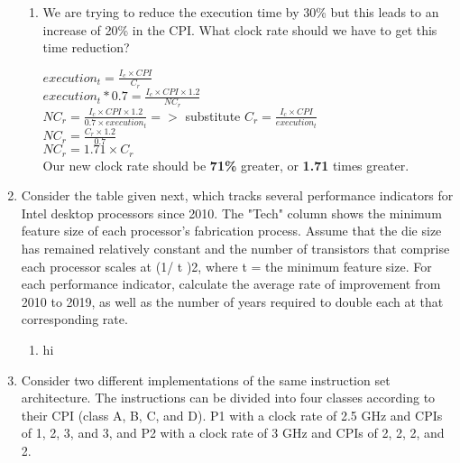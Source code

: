 \documentclass[10pt]{article}
\begin{document}
\begin{enumerate}
\begin{enumerate}
        \item We are trying to reduce the execution time by 30\% but this leads to an increase of 20\% in the CPI. What clock rate should we have to get this time reduction?
        \begin{center}
            $execution_t = \frac{I_c \times CPI}{C_r}$\\
            $execution_t * 0.7 = \frac{I_c \times CPI \times 1.2}{NC_r}$\\
            $NC_r = \frac{I_c \times CPI \times 1.2}{0.7 \times execution_t} =>$ substitute $C_r = \frac{I_c \times CPI}{execution_t}$\\
            $NC_r = \frac{C_r \times 1.2}{0.7}$\\
            $NC_r = 1.71 \times C_r$\\
            Our new clock rate should be \textbf{71\%} greater, or \textbf{1.71} times greater.
        \end{center}
    \end{enumerate}
    \item Consider the table given next, which tracks several performance indicators for Intel desktop processors since 2010.
    The "Tech" column shows the minimum feature size of each processor's fabrication process. Assume that the die size has remained relatively constant and the number of transistors that comprise each processor scales at (1/ t )2, where t = the minimum feature size.
    For each performance indicator, calculate the average rate of improvement from 2010 to 2019, as well as the number of years required to double each at that corresponding rate.
    \begin{enumerate}
        \item hi
    \end{enumerate}
    \item Consider two different implementations of the same instruction set architecture. The instructions can be divided into four classes according to their CPI (class A, B, C, and D). P1 with a clock rate of 2.5 GHz and CPIs of 1, 2, 3, and 3, and P2 with a clock rate of 3 GHz and CPIs of 2, 2, 2, and 2.


\end{enumerate}
\end{document}
